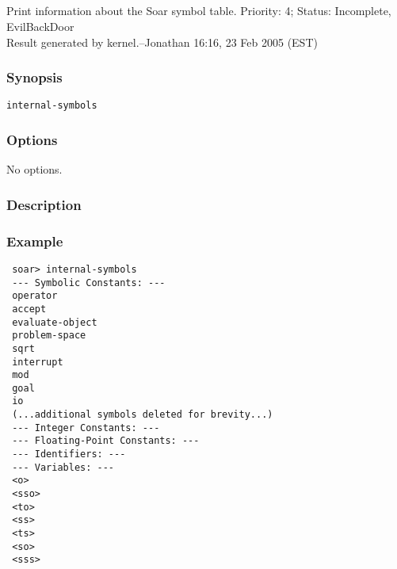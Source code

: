 \subsection{}
\label{internal-symbols}
Print information about the Soar symbol table. 
 Priority: 4; Status: Incomplete, EvilBackDoor\\ 
Result generated by kernel.--Jonathan 16:16, 23 Feb 2005 (EST) 
\subsubsection*{Synopsis}
\begin{verbatim}
internal-symbols
\end{verbatim}
\subsubsection*{Options}
 No options. 
\subsubsection*{Description}
\subsubsection*{Example}
\begin{verbatim}
 soar> internal-symbols
 --- Symbolic Constants: ---
 operator
 accept
 evaluate-object
 problem-space
 sqrt
 interrupt
 mod
 goal
 io
 (...additional symbols deleted for brevity...)
 --- Integer Constants: ---
 --- Floating-Point Constants: ---
 --- Identifiers: ---
 --- Variables: ---  
 <o>
 <sso>
 <to>
 <ss>
 <ts>
 <so>
 <sss>
\end{verbatim}
